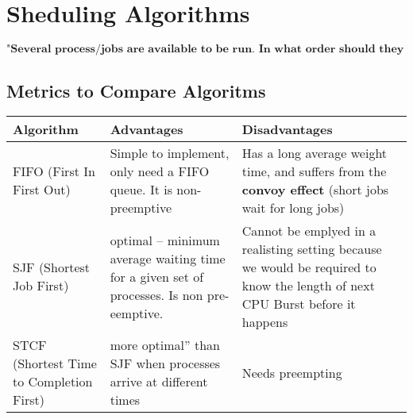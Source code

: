 \documentclass[a4paper, 10pt]{article}
\begin{document}
\section{Sheduling Algorithms}
$$\textbf{"Several process/jobs are available to be run. In what order should they be executed?}$$
\subsection{Metrics to Compare Algoritms}
\begin{table}[h!]
    \centering
    \begin{tabularx}{\textwidth}{@{} l X X @{}}
        \toprule
        Algorithm                & Advantages                                                                                                                    & Disadvantages \\
        \midrule
        FIFO (First In First Out)
                                 & Simple to implement, only need a FIFO queue. It is non-preemptive
                                 & Has a long average weight time, and suffers from the \textbf{convoy effect} (short jobs wait for long jobs)
        \\
        \addlinespace[2ex]
        SJF (Shortest Job First) & optimal – minimum average waiting time for a given set of processes.
        Is non pre-eemptive.
                                 & Cannot be emplyed in a realisting setting because we would be required to know the length of next CPU Burst before it happens
        \\
        STCF (Shortest Time to Completion First)
                                 & more optimal” than SJF when processes arrive at
        different times
                                 & Needs preempting
    \end{tabularx}
\end{table}
\end{document}
